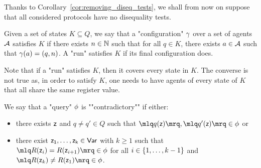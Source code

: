 Thanks to Corollary~\ref{cor:removing_diseq_tests}, we shall from now on suppose that all considered protocols have no disequality tests. 

\begin{definition}
	Given a set of states $K \subseteq Q$, we say that a "configuration" $\gamma$ over a set of agents $\mathcal{A}$ satisfies $K$ if there exists $n \in \mathbb{N}$ such that for all $q \in K$, there exists $a \in \mathcal{A}$ such that $\gamma(a) = (q,n)$.
	A "run" satisfies $K$ if its final configuration does.
\end{definition}
Note that if a "run" satisfies $K$, then it covers every state in $K$. The converse is not true as, in order to satisfy $K$, one needs to have agents of every state of $K$ that all share the same register value. 

\begin{definition}
We say that a "query" $\phi$ is ""contradictory"" if either:
	\begin{itemize}
		\item there exists $\mathsf{z}$ and $q \neq q' \in Q$ such that $\quotemarks{q(\varz)}, \quotemarks{q'(\varz)} \in \query$ or
		
		\item there exist $\mathsf{z_1}, \ldots, \mathsf{z_k} \in \mathsf{Var}$ with $k\geq 1$ such that $\quotemarks{R(\varz_{i}) = R(\varz_{i+1})} \in \query$ for all $i \in \{1,\ldots,k-1\}$ and $\quotemarks{R(\varz_k) \neq R(\varz_1)} \in \query$.
	\end{itemize}
\end{definition}

